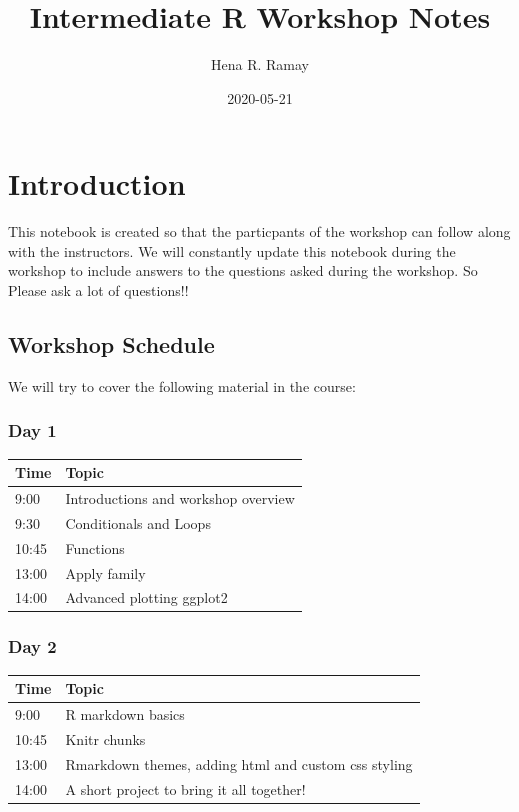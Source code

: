 \documentclass[
]{book}
\title{Intermediate R Workshop Notes}
\author{Hena R. Ramay}
\date{2020-05-21}
\begin{document}
\maketitle

{
\setcounter{tocdepth}{1}
\tableofcontents
}
\hypertarget{introduction}{%
\chapter{Introduction}\label{introduction}}

This notebook is created so that the particpants of the workshop can follow along with the instructors. We will constantly update this notebook during the workshop to include answers to the questions asked during the workshop. So Please ask a lot of questions!!

\hypertarget{workshop-schedule}{%
\section{Workshop Schedule}\label{workshop-schedule}}

We will try to cover the following material in the course:

\hypertarget{day-1}{%
\subsection*{Day 1}\label{day-1}}

\begin{longtable}[]{@{}ll@{}}
\toprule
Time & Topic\tabularnewline
\midrule
\endhead
9:00 & Introductions and workshop overview\tabularnewline
9:30 & Conditionals and Loops\tabularnewline
10:45 & Functions\tabularnewline
13:00 & Apply family\tabularnewline
14:00 & Advanced plotting ggplot2\tabularnewline
\bottomrule
\end{longtable}

\hypertarget{day-2}{%
\subsection*{Day 2}\label{day-2}}

\begin{longtable}[]{@{}ll@{}}
\toprule
Time & Topic\tabularnewline
\midrule
\endhead
9:00 & R markdown basics\tabularnewline
10:45 & Knitr chunks\tabularnewline
13:00 & Rmarkdown themes, adding html and custom css styling\tabularnewline
14:00 & A short project to bring it all together!\tabularnewline
\bottomrule
\end{longtable}
\end{document}
